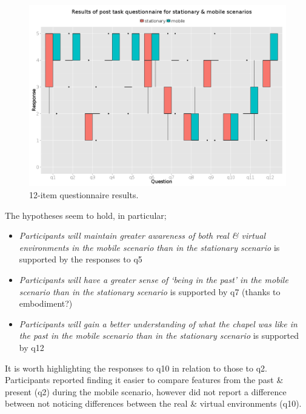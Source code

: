 \begin{figure}[h]
	\begin{center}
		\includegraphics[width=0.9\linewidth]{images/1/post_task_questionnaire_boxplot.png}
		\caption{12-item questionnaire results.}
		\label{12-item_boxplot}
	\end{center}
\end{figure}

The hypotheses seem to hold, in particular;

\begin{itemize}
	\item \textit{Participants will maintain greater awareness of both real \& virtual environments in the mobile scenario than in the stationary scenario} is supported by the responses to q5
	\item \textit{Participants will have a greater sense of `being in the past' in the mobile scenario than in the stationary scenario} is supported by q7 (thanks to embodiment?)
	\item \textit{Participants will gain a better understanding of what the chapel was like in the past in the mobile scenario than in the stationary scenario} is supported by q12
\end{itemize}

It is worth highlighting the responses to q10 in relation to those to q2. Participants reported finding it easier to compare features from the past \& present (q2) during the mobile scenario, however did not report a difference between not noticing differences between the real \& virtual environments (q10).


